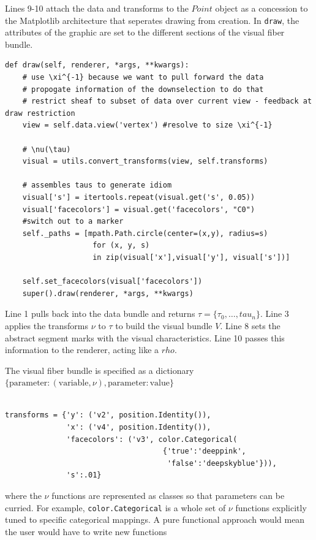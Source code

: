 \documentclass[../main.tex]{subfiles}
\begin{document}
Lines 9-10 attach the data and transforms to the $Point$ object as a concession to the Matplotlib architecture that seperates drawing from creation. In \texttt{draw}, the attributes of the graphic are set to the different sections of the visual fiber bundle. 

\begin{verbatim}
def draw(self, renderer, *args, **kwargs):
    # use \xi^{-1} because we want to pull forward the data
    # propogate information of the downselection to do that 
    # restrict sheaf to subset of data over current view - feedback at draw restriction
    view = self.data.view('vertex') #resolve to size \xi^{-1}
    
    # \nu(\tau)
    visual = utils.convert_transforms(view, self.transforms)
        
    # assembles taus to generate idiom
    visual['s'] = itertools.repeat(visual.get('s', 0.05))
    visual['facecolors'] = visual.get('facecolors', "C0")
    #switch out to a marker 
    self._paths = [mpath.Path.circle(center=(x,y), radius=s)  
                    for (x, y, s) 
                    in zip(visual['x'],visual['y'], visual['s'])] 
    
    self.set_facecolors(visual['facecolors'])
    super().draw(renderer, *args, **kwargs)
\end{verbatim}

Line 1 pulls back into the data bundle and returns $\tau = \{\tau_0, \ldots, tau_{n}\}$. Line 3 applies the transforms $\nu$ to $\tau$ to build the visual bundle $V$.  Line 8 sets the abstract segment marks with the visual characteristics. Line 10 passes this information to the renderer, acting like a $rho$. 

The visual fiber bundle is specified as a dictionary $\{\mbox{parameter}: (\mbox{variable}, \nu), \mbox{parameter}:\mbox{value}\}$ 
\begin{verbatim}

transforms = {'y': ('v2', position.Identity()),       
              'x': ('v4', position.Identity()),
              'facecolors': ('v3', color.Categorical(
                                    {'true':'deeppink', 
                                     'false':'deepskyblue'})), 
              's':.01}
\end{verbatim}

where the $\nu$ functions are represented as classes so that parameters can be curried. For example, \texttt{color.Categorical} is a whole set of $\nu$ functions explicitly tuned to specific categorical mappings. A pure functional approach would mean the user would have to write new functions
\end{document}
